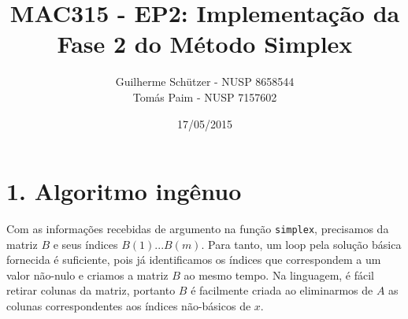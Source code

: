 \documentclass[a4paper]{article}
\title{MAC315 - EP2: Implementação da Fase 2 do Método Simplex}
\author{
	Guilherme Schützer - NUSP 8658544 \\
	Tomás Paim         - NUSP 7157602
}
\date{17/05/2015}
\begin{document}
\maketitle

\section{1. Algoritmo ingênuo}
Com as informações recebidas de argumento na função \texttt{simplex}, precisamos da matriz $B$ e seus índices $B(1)...B(m)$. Para tanto, um loop pela solução básica fornecida é suficiente, pois já identificamos os índices que correspondem a um valor não-nulo e criamos a matriz $B$ ao mesmo tempo. Na linguagem, é fácil retirar colunas da matriz, portanto $B$ é facilmente criada ao eliminarmos de $A$ as colunas correspondentes aos índices não-básicos de $x$.
\end{document}
